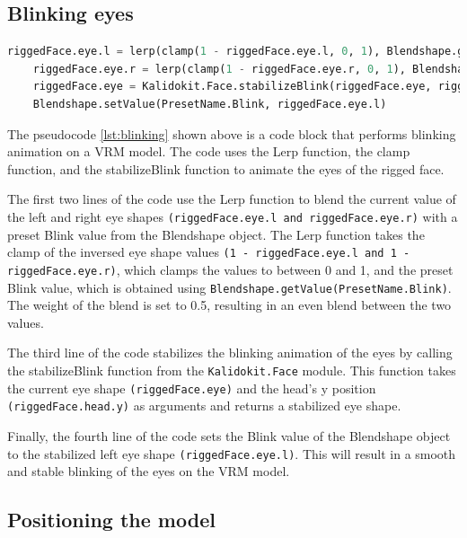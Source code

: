 \subsection{Blinking eyes}
\begin{lstlisting}[language=Python,caption=Blinking of the eyes,label=lst:blinking]
    riggedFace.eye.l = lerp(clamp(1 - riggedFace.eye.l, 0, 1), Blendshape.getValue(PresetName.Blink), 0.5)
    riggedFace.eye.r = lerp(clamp(1 - riggedFace.eye.r, 0, 1), Blendshape.getValue(PresetName.Blink), 0.5)
    riggedFace.eye = Kalidokit.Face.stabilizeBlink(riggedFace.eye, riggedFace.head.y)
    Blendshape.setValue(PresetName.Blink, riggedFace.eye.l)

\end{lstlisting}
The pseudocode \ref{lst:blinking} shown above is a code block that performs blinking animation on a VRM model. 
The code uses the Lerp function, the clamp function, and the stabilizeBlink function 
to animate the eyes of the rigged face.

The first two lines of the code use the Lerp function to blend the current value of the left and right eye shapes 
\texttt{(riggedFace.eye.l and riggedFace.eye.r)} with a preset Blink value from the Blendshape object. The Lerp 
function takes the clamp of the inversed eye shape values \texttt{(1 - riggedFace.eye.l and 1 - riggedFace.eye.r)}, 
which clamps the values to between 0 and 1, and the preset Blink value, which is obtained using \texttt{Blendshape.getValue(PresetName.Blink)}. 
The weight of the blend is set to 0.5, resulting in an even blend between the two values.

The third line of the code stabilizes the blinking animation of the eyes by calling 
the stabilizeBlink function from the \texttt{Kalidokit.Face} module. This function takes the 
current eye shape \texttt{(riggedFace.eye)} and the head's y position \texttt{(riggedFace.head.y)}  as arguments 
and returns a stabilized eye shape.

Finally, the fourth line of the code sets the Blink value of the Blendshape object to the 
stabilized left eye shape \texttt{(riggedFace.eye.l)}. This will result in a smooth and stable blinking  
of the eyes on the VRM model.

\subsection{Positioning the model}

